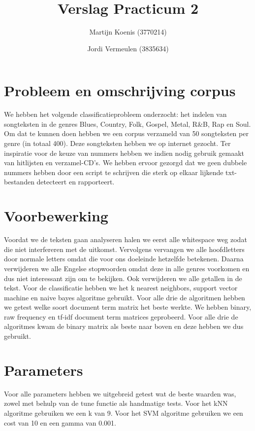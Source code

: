 \documentclass[a4paper,oneside]{article}
\begin{document}
\title{Verslag Practicum 2}
\author{Martijn Koenis (3770214) \and Jordi Vermeulen (3835634)}
\date{}
\maketitle
\tabulinesep=1.2mm

\begin{abstract}
\end{abstract}

\section{Probleem en omschrijving corpus}
We hebben het volgende classificatieprobleem onderzocht: het indelen van songteksten in de genres Blues, Country, Folk, Gospel, Metal, R\&B, Rap en Soul.  Om dat te kunnen doen hebben we een corpus verzameld van 50 songteksten per genre (in totaal 400). Deze songteksten hebben we op internet gezocht. Ter inspiratie voor de keuze van nummers hebben we indien nodig gebruik gemaakt van hitlijsten en verzamel-CD's. We hebben ervoor gezorgd dat we geen dubbele nummers hebben door een script te schrijven die sterk op elkaar lijkende txt-bestanden detecteert en rapporteert.

\section{Voorbewerking}
Voordat we de teksten gaan analyseren halen we eerst alle whitespace weg zodat die niet interfereren met de uitkomst. Vervolgens vervangen we alle hoofdletters door normale letters omdat die voor ons doeleinde hetzelfde betekenen. Daarna verwijderen we alle Engelse stopwoorden omdat deze in alle genres voorkomen en dus niet interessant zijn om te bekijken. Ook verwijderen we alle getallen in de tekst. Voor de classificatie hebben we het k nearest neighbors, support vector machine en naive bayes algoritme gebruikt. Voor alle drie de algoritmen hebben we getest welke soort document term matrix het beste werkte. We hebben binary, raw frequency en tf-idf document term matrices geprobeerd. Voor alle drie de algoritmes kwam de binary matrix als beste naar boven en deze hebben we dus gebruikt.

\section{Parameters}
Voor alle parameters hebben we uitgebreid getest wat de beste waarden was, zowel met behulp van de tune functie als handmatige tests. Voor het kNN algoritme gebruiken we een k van 9. Voor het SVM algoritme gebruiken we een cost van 10 en een gamma van 0.001.
\end{document}
